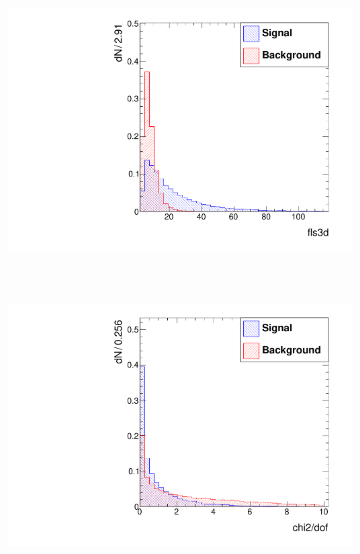 \documentclass[10pt,a4paper]{article}
\begin{document}
\begin{figure}
        ~
        \begin{subfigure}[b]{0.2\textwidth}
                \centering
                \includegraphics[width=\textwidth]{Figures/fls3d_barrel}
                \label{fig:fls3dBarrel}
        \end{subfigure}
        ~
        \begin{subfigure}[b]{0.2\textwidth}
                \centering
                \includegraphics[width=\textwidth]{Figures/chi2dof_barrel}
                \label{fig:chi2dofBarrel}
        \end{subfigure}
        

\end{figure}
\end{document}
